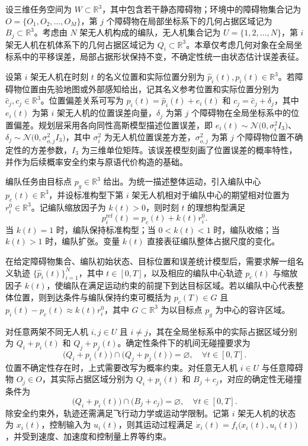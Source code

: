 设三维任务空间为 $W \subset \mathbb{R}^{3}$，其中包含若干静态障碍物；环境中的障碍物集合记为 $O = \{O_{1}, O_{2}, \ldots, O_{M}\}$，第 $j$ 个障碍物在局部坐标系下的几何占据区域记为 $B_{j} \subset \mathbb{R}^{3}$。考虑由 $N$ 架无人机构成的编队，无人机集合记为 $U = \{1,2,\ldots,N\}$，第 $i$ 架无人机在机体系下的几何占据区域记为 $Q_{i} \subset \mathbb{R}^{3}$。本章仅考虑几何对象在全局坐标系中的平移误差，局部占据形状保持不变，不确定性统一由状态估计误差表征。

设第 $i$ 架无人机在时刻 $t$ 的名义位置和实际位置分别为 $\hat{p}_{i}(t), p_{i}(t) \in \mathbb{R}^{3}$。若障碍物位置由先验地图或外部感知给出，记其名义参考位置和实际位置分别为 $\hat{c}_{j}, c_{j} \in \mathbb{R}^{3}$。位置偏差关系可写为 $p_{i}(t)=\hat{p}_{i}(t)+e_{i}(t)$ 和 $c_{j}=\hat{c}_{j}+\delta_{j}$，其中 $e_{i}(t)$ 为第 $i$ 架无人机的位置误差向量，$\delta_{j}$ 为第 $j$ 个障碍物在全局坐标系中的位置偏差。规划层采用各向同性高斯模型描述位置误差，即 $e_{i}(t)\sim \mathcal{N}\bigl(0,\sigma_{i}^{2}I_{3}\bigr)$、$\delta_{j}\sim \mathcal{N}\bigl(0,\sigma_{o,j}^{2}I_{3}\bigr)$，其中 $\sigma_{i}^{2}$ 为无人机位置误差方差，$\sigma_{o,j}^{2}$ 为第 $j$ 个障碍物位置不确定性的方差参数，$I_{3}$ 为三维单位矩阵。该误差模型刻画了位置误差的概率特性，并作为后续概率安全约束与原语代价构造的基础。

编队任务由目标点 $p_{g} \in \mathbb{R}^{3}$ 给出。为统一描述整体运动，引入编队中心 $p_{c}(t) \in \mathbb{R}^{3}$，并设标准构型下第 $i$ 架无人机相对于编队中心的期望相对位置为 $r_{i}^{0} \in \mathbb{R}^{3}$。记编队缩放因子为 $k(t) > 0$，则时刻 $t$ 的理想构型满足
\[
p_{i}^{\mathrm{ref}}(t) = p_{c}(t) + k(t) r_{i}^{0}.
\]
当 $k(t)=1$ 时，编队保持标准构型；当 $0<k(t)<1$ 时，编队收缩；当 $k(t)>1$ 时，编队扩张。变量 $k(t)$ 直接表征编队整体占据尺度的变化。

在给定障碍物集合、编队初始状态、目标位置和误差统计模型后，需要求解一组名义轨迹 $\bigl\{\hat{p}_{i}(t)\bigr\}_{i=1}^{N}$，其中 $t \in [0,T]$，以及相应的编队中心轨迹 $p_{c}(t)$ 与缩放因子 $k(t)$，使编队在满足运动约束的前提下到达目标区域。若以编队中心代表整体位置，则到达条件与编队保持约束可概括为 $p_{c}(T)\in G$ 且 $p_{i}(t)-p_{c}(t)\approx k(t) r_{i}^{0}$，其中 $G \subset \mathbb{R}^{3}$ 为以目标点 $p_{g}$ 为中心的容许区域。

对任意两架不同无人机 $i,j\in U$ 且 $i\neq j$，其在全局坐标系中的实际占据区域分别为 $Q_{i} + p_{i}(t)$ 和 $Q_{j} + p_{j}(t)$。确定性条件下的机间无碰撞要求为
\[
\bigl(Q_{i} + p_{i}(t)\bigr) \cap \bigl(Q_{j} + p_{j}(t)\bigr) = \varnothing, \quad \forall t\in[0,T].
\]
位置不确定性存在时，上式需要改写为概率约束。对任意无人机 $i\in U$ 与任意障碍物 $O_{j}\in O$，其实际占据区域分别为 $Q_{i} + p_{i}(t)$ 和 $B_{j} + c_{j}$，对应的确定性无碰撞条件为
\[
\bigl(Q_{i} + p_{i}(t)\bigr) \cap \bigl(B_{j} + c_{j}\bigr) = \varnothing, \quad \forall t\in[0,T].
\]
除安全约束外，轨迹还需满足飞行动力学或运动学限制。记第 $i$ 架无人机的状态为 $x_{i}(t)$，控制输入为 $u_{i}(t)$，则其运动过程满足 $\dot{x}_{i}(t)=f_{i}\bigl(x_{i}(t),u_{i}(t)\bigr)$，并受到速度、加速度和控制量上界等约束。

